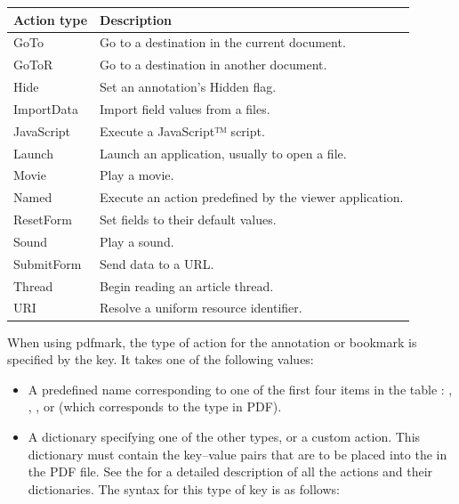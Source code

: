 \documentclass[letterpaper,12pt,english,openany,oneside]{sphinxmanual}
\begin{document}
\begin{savenotes}\sphinxattablestart
\centering
\begin{tabulary}{\linewidth}[t]{|T|T|}
\hline
\sphinxstyletheadfamily 
Action type
&\sphinxstyletheadfamily 
Description
\\
\hline
GoTo
&
Go to a destination in the current document.
\\
\hline
GoToR
&
Go to a destination in another document.
\\
\hline
Hide
&
Set an annotation’s Hidden flag.
\\
\hline
ImportData
&
Import field values from a files.
\\
\hline
JavaScript
&
Execute a JavaScript™ script.
\\
\hline
Launch
&
Launch an application, usually to open a file.
\\
\hline
Movie
&
Play a movie.
\\
\hline
Named
&
Execute an action predefined by the viewer application.
\\
\hline
ResetForm
&
Set fields to their default values.
\\
\hline
Sound
&
Play a sound.
\\
\hline
SubmitForm
&
Send data to a URL.
\\
\hline
Thread
&
Begin reading an article thread.
\\
\hline
URI
&
Resolve a uniform resource identifier.
\\
\hline
\end{tabulary}
\par
\sphinxattableend\end{savenotes}

When using pdfmark, the type of action for the annotation or bookmark is specified by the  key. It takes one of the following values:
\begin{itemize}
\item {} 
A predefined name corresponding to one of the first four items in the table :  ,  ,  , or  (which corresponds to the  type in PDF).

\item {} 
A dictionary specifying one of the other types, or a custom action. This dictionary must contain the key–value pairs that are to be placed into the  in the PDF file. See the  for a detailed description of all the actions and their dictionaries. The syntax for this type of  key is as follows:

\end{itemize}
\end{document}

